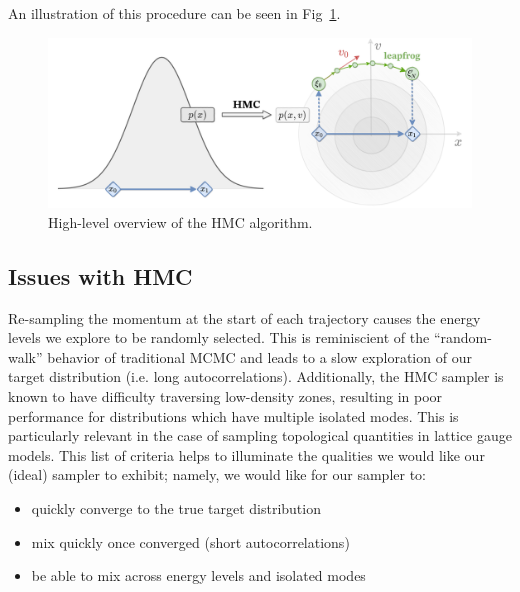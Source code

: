 \documentclass[a4paper,11pt]{article}
\begin{document}
%
An illustration of this procedure can be seen in Fig~\ref{fig:hmc}.
%
\begin{figure}[htpb]
    \centering
    \includegraphics[width=\textwidth]{assets/hmc.pdf}
    \caption{\label{fig:hmc}High-level overview of the HMC algorithm.}
\end{figure}
%
\subsection{\label{subsec:hmc_issues}Issues with HMC}
%
Re-sampling the momentum at the start of each trajectory causes the energy
levels we explore to be randomly selected.
%
This is reminiscient of the ``random-walk'' behavior of traditional MCMC and
leads to a slow exploration of our target distribution (i.e. long
autocorrelations).
%
%
Additionally, the HMC sampler is known to have difficulty traversing
low-density zones, resulting in poor performance for distributions which have
multiple isolated modes.
%
This is particularly relevant in the case of sampling topological quantities in lattice gauge models.
%
%
This list of criteria helps to illuminate the qualities we would like our
(ideal) sampler to exhibit; namely, we would like for our sampler to: 
%
\begin{itemize}
    \item quickly converge to the true target distribution
    \item mix quickly once converged (short autocorrelations)
    \item be able to mix across energy levels and isolated modes
\end{itemize}
%
\end{document}
